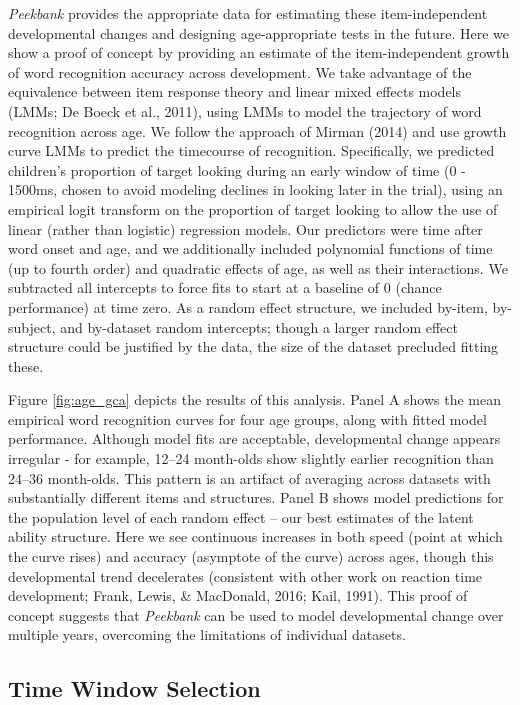 \documentclass[10pt, letterpaper]{article}
\begin{document}
\emph{Peekbank} provides the appropriate data for estimating these
item-independent developmental changes and designing age-appropriate
tests in the future. Here we show a proof of concept by providing an
estimate of the item-independent growth of word recognition accuracy
across development. We take advantage of the equivalence between item
response theory and linear mixed effects models (LMMs; De Boeck et al.,
2011), using LMMs to model the trajectory of word recognition across
age. We follow the approach of Mirman (2014) and use growth curve LMMs
to predict the timecourse of recognition. Specifically, we predicted
children's proportion of target looking during an early window of time
(0 - 1500ms, chosen to avoid modeling declines in looking later in the
trial), using an empirical logit transform on the proportion of target
looking to allow the use of linear (rather than logistic) regression
models. Our predictors were time after word onset and age, and we
additionally included polynomial functions of time (up to fourth order)
and quadratic effects of age, as well as their interactions. We
subtracted all intercepts to force fits to start at a baseline of 0
(chance performance) at time zero. As a random effect structure, we
included by-item, by-subject, and by-dataset random intercepts; though a
larger random effect structure could be justified by the data, the size
of the dataset precluded fitting these.

Figure \ref{fig:age_gca} depicts the results of this analysis. Panel A
shows the mean empirical word recognition curves for four age groups,
along with fitted model performance. Although model fits are acceptable,
developmental change appears irregular - for example, 12--24 month-olds
show slightly earlier recognition than 24--36 month-olds. This pattern
is an artifact of averaging across datasets with substantially different
items and structures. Panel B shows model predictions for the population
level of each random effect -- our best estimates of the latent ability
structure. Here we see continuous increases in both speed (point at
which the curve rises) and accuracy (asymptote of the curve) across
ages, though this developmental trend decelerates (consistent with other
work on reaction time development; Frank, Lewis, \& MacDonald, 2016;
Kail, 1991). This proof of concept suggests that \emph{Peekbank} can be
used to model developmental change over multiple years, overcoming the
limitations of individual datasets.

\hypertarget{time-window-selection}{%
\subsection{Time Window Selection}\label{time-window-selection}}
\end{document}
